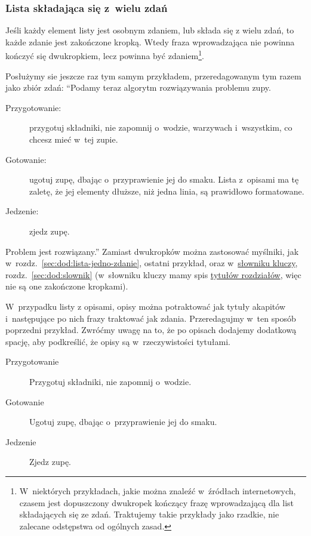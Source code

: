 \subsubsection{Lista składająca się z~wielu zdań}
\label{sec:dod:lista-wiele-zdan}

Jeśli każdy element listy jest osobnym zdaniem, lub składa się z wielu zdań, to każde zdanie jest zakończone kropką. Wtedy fraza wprowadzająca nie powinna kończyć się dwukropkiem, lecz powinna być zdaniem\footnote{W~niektórych przykładach, jakie można znaleźć w~źródłach internetowych, czasem jest dopuszczony dwukropek kończący frazę wprowadzającą dla list składających się ze zdań. Traktujemy takie przykłady jako rzadkie, nie zalecane odstępstwa od ogólnych zasad.}.

Posłużymy sie jeszcze raz tym samym przykładem, przeredagowanym tym razem jako zbiór zdań: ``Podamy teraz algorytm rozwiązywania problemu zupy.
\begin{description}
  \item[Przygotowanie:] przygotuj składniki, nie zapomnij o~wodzie, warzywach i~wszystkim, co chcesz mieć w~tej zupie.
  \item[Gotowanie:] ugotuj zupę, dbając o~przyprawienie jej do smaku. Lista z~opisami ma tę zaletę, że jej elementy dłuższe, niż jedna linia, są prawidłowo formatowane.
  \item[Jedzenie:] zjedz zupę.
\end{description}
Problem jest rozwiązany.''
Zamiast dwukropków można zastosować myślniki, jak w~rozdz.~\ref{sec:dod:lista-jedno-zdanie}, ostatni przykład, oraz w~\hyperref[sec:dod:slownik]{słowniku kluczy}, rozdz.~\ref{sec:dod:slownik} (w~słowniku kluczy mamy spis \hyperref[sec:dod:tytul]{tytułów rozdziałów}, więc nie są one zakończone kropkami).

W~przypadku listy z opisami, opisy można potraktować jak tytuły akapitów i~następujące po nich frazy traktować jak zdania. Przeredagujmy w~ten sposób poprzedni przykład. Zwróćmy uwagę na to, że po opisach dodajemy dodatkową spację, aby podkreślić, że opisy są w~rzeczywistości tytułami.
\begin{description}
  \item[Przygotowanie~] Przygotuj składniki, nie zapomnij o~wodzie.
  \item[Gotowanie~] Ugotuj zupę, dbając o~przyprawienie jej do smaku.
  \item[Jedzenie~] Zjedz zupę.
\end{description}


